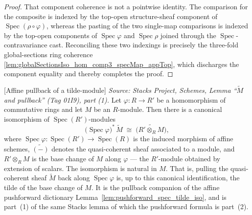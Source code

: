 \begin{lemma}
\begin{proof}
    That component coherence is not a pointwise identity. The comparison for the composite
    is indexed by the top-open structure-sheaf component of
    \(\operatorname{Spec}(\rho\circ\varphi)\), whereas the pasting of the two single-map
    comparisons is indexed by the top-open components of \(\operatorname{Spec}\varphi\) and
    \(\operatorname{Spec}\rho\) joined through the \(\operatorname{Spec}\)-contravariance
    cast. Reconciling these two indexings is precisely the three-fold global-sections ring
    coherence \cref{lem:globalSectionsIso_hom_comp3_specMap_appTop}, which discharges the
    component equality and thereby completes the proof.
  \end{proof}
\end{lemma}

\begin{lemma}


[Affine pullback of a tilde-module]
  \label{lem:pullback_spec_tilde_iso}
  \textit{Source: Stacks Project, Schemes, Lemma ``\(\widetilde M\) and pullback''
  (Tag 01I9), part (1).}
  Let \(\varphi : R \to R'\) be a homomorphism of commutative rings and let \(M\)
  be an \(R\)-module. Then there is a canonical isomorphism of
  \(\operatorname{Spec}(R')\)-modules
  \[
    \bigl(\operatorname{Spec}\varphi\bigr)^{*}\,\widetilde{M}
    \;\cong\;
    \widetilde{\bigl(R' \otimes_R M\bigr)},
  \]
  where \(\operatorname{Spec}\varphi : \operatorname{Spec}(R') \to
  \operatorname{Spec}(R)\) is the induced morphism of affine schemes,
  \(\widetilde{(-)}\) denotes the quasi-coherent sheaf associated to a module, and
  \(R' \otimes_R M\) is the base change of \(M\) along \(\varphi\) — the
  \(R'\)-module obtained by extension of scalars. The isomorphism is natural in
  \(M\). That is, pulling the quasi-coherent sheaf \(\widetilde{M}\) back along
  \(\operatorname{Spec}\varphi\) is, up to this canonical identification, the tilde
  of the base change of \(M\). It is the pullback companion of the affine
  pushforward dictionary Lemma~\ref{lem:pushforward_spec_tilde_iso}, and is part~(1)
  of the same Stacks lemma of which the pushforward formula is part~(2).
\end{lemma}

